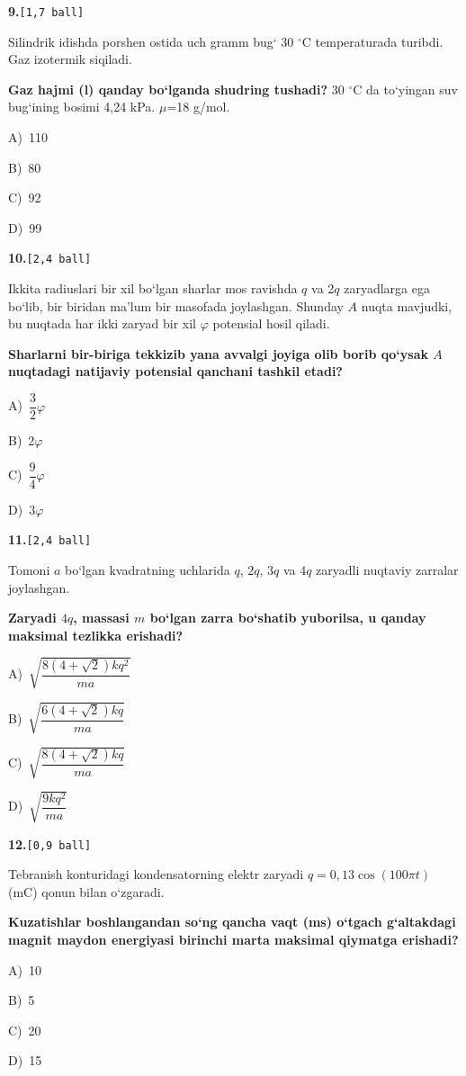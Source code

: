 \documentclass[11pt,a4paper]{article}
\newcommand{\ball}[1]{\hfill\texttt{[#1 ball]}}
\newcommand{\qhead}[2]{\Needspace{10\baselineskip}\noindent\textbf{#1.}\ball{#2}\par\nopagebreak}
\newcommand{\opt}[2]{\hspace*{8mm}#1)\ #2\par}
\newenvironment{qbody}{\begin{list}{}{\leftmargin=8mm\rightmargin=0pt\topsep=0pt\itemsep=0pt\parsep=3pt}\item\relax}{\end{list}}
\begin{document}
\noindent\begin{minipage}{\linewidth}
\qhead{9}{1,7}
\begin{qbody}
Silindrik idishda porshen ostida uch gramm bug‘ 30 $^\circ$C temperaturada turibdi. Gaz izotermik siqiladi.\par
\textbf{Gaz hajmi (l) qanday bo‘lganda shudring tushadi?} 30 $^\circ$C da to‘yingan suv bug‘ining bosimi 4,24 kPa. $\mu$=18 g/mol.\par
\smallskip
\opt{A}{110}
\opt{B}{80}
\opt{C}{92}
\opt{D}{99}
\end{qbody}\end{minipage}\par\vspace{16pt}
\noindent\begin{minipage}{\linewidth}
\qhead{10}{2,4}
\begin{qbody}
Ikkita radiuslari bir xil bo‘lgan sharlar mos ravishda $q$ va 2$q$ zaryadlarga ega bo‘lib, bir biridan ma’lum bir masofada joylashgan. Shunday $A$ nuqta mavjudki, bu nuqtada har ikki zaryad bir xil $\varphi$ potensial hosil qiladi.\par
\textbf{Sharlarni bir-biriga tekkizib yana avvalgi joyiga olib borib qo‘ysak $A$ nuqtadagi natijaviy potensial qanchani tashkil etadi?}\par
\smallskip
\opt{A}{$\dfrac{3}{2}\varphi$}
\opt{B}{2$\varphi$}
\opt{C}{$\dfrac{9}{4}\varphi$}
\opt{D}{3$\varphi$}
\end{qbody}\end{minipage}\par\vspace{16pt}
\noindent\begin{minipage}{\linewidth}
\qhead{11}{2,4}
\begin{qbody}
Tomoni $a$ bo‘lgan kvadratning uchlarida $q$, $2q$, $3q$ va $4q$ zaryadli nuqtaviy zarralar joylashgan.\par
\textbf{Zaryadi $4q$, massasi $m$ bo‘lgan zarra bo‘shatib yuborilsa, u qanday maksimal tezlikka erishadi?}\par
\smallskip
\opt{A}{$\sqrt{\dfrac{8(4+\sqrt2)kq^2}{ma}}$}
\opt{B}{$\sqrt{\dfrac{6(4+\sqrt2)kq}{ma}}$}
\opt{C}{$\sqrt{\dfrac{8(4+\sqrt2)kq}{ma}}$}
\opt{D}{$\sqrt{\dfrac{9kq^2}{ma}}$}
\end{qbody}\end{minipage}\par\vspace{16pt}
\noindent\begin{minipage}{\linewidth}
\qhead{12}{0,9}
\begin{qbody}
Tebranish konturidagi kondensatorning elektr zaryadi $q=0{,}13\cos(100\pi t)$ (mC) qonun bilan o‘zgaradi.\par
\textbf{Kuzatishlar boshlangandan so‘ng qancha vaqt (ms) o‘tgach g‘altakdagi magnit maydon energiyasi birinchi marta maksimal qiymatga erishadi?}\par
\smallskip
\opt{A}{10}
\opt{B}{5}
\opt{C}{20}
\opt{D}{15}
\end{qbody}\end{minipage}\par\vspace{16pt}
\end{document}
